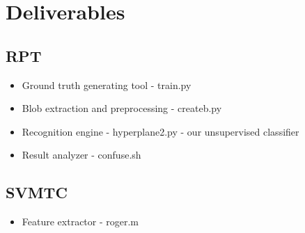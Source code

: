 
\section{Deliverables}
\subsection{RPT}
\begin{itemize}
\item Ground truth generating tool - train.py 
\item Blob extraction and preprocessing - createb.py
\item Recognition engine - hyperplane2.py - our unsupervised classifier
\item Result analyzer - confuse.sh 
\end{itemize}
\subsection{SVMTC}
\begin{itemize}
\item Feature extractor - roger.m 
\end{itemize}